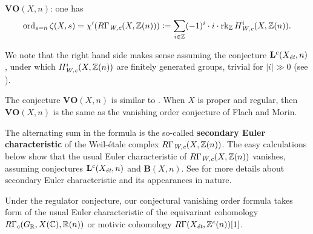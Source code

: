 \documentclass{article}
\numberwithin{equation}{section}
\begin{document}
\begin{conjecture}
  $\mathbf{VO} (X,n)$: one has
  \[ \ord_{s=n} \zeta (X,s) =
    \chi' (R\Gamma_\Wc (X, \ZZ (n))) \dfn
    \sum_{i \in \ZZ} (-1)^i \cdot i \cdot \rk_\ZZ H^i_\Wc (X, \ZZ (n)). \]
\end{conjecture}

We note that the right hand side makes sense assuming the conjecture
$\mathbf{L}^c (X_\et,n)$, under which $H^i_\Wc (X, \ZZ (n))$ are finitely
generated groups, trivial for $|i| \gg 0$
(see \cite[Proposition~7.12]{Beshenov-Weil-etale-1}).

\begin{remark}
  The conjecture $\mathbf{VO} (X,n)$ is similar to
  \cite[Conjecture~5.11]{Flach-Morin-2018}. When $X$ is proper and regular, then
  $\mathbf{VO} (X,n)$ is the same as the vanishing order conjecture of Flach and
  Morin.
\end{remark}

\begin{remark}
  The alternating sum in the formula is the so-called
  \textbf{secondary Euler characteristic} of the Weil-étale complex
  $R\Gamma_\Wc (X, \ZZ (n))$.  The easy calculations below show that the usual
  Euler characteristic of $R\Gamma_\Wc (X, \ZZ (n))$ vanishes, assuming
  conjectures $\mathbf{L}^c (X_\et,n)$ and $\mathbf{B} (X,n)$.
  See \cite{Ramachandran-2016} for more details about secondary Euler
  characteristic and its appearances in nature.
\end{remark}

Under the regulator conjecture, our conjectural vanishing order formula takes
form of the usual Euler characteristic of the equivariant cohomology
$R\Gamma_c (G_\RR, X(\CC), \RR (n))$ or motivic cohomology
$R\Gamma (X_\et, \ZZ^c (n)) [1]$.
\end{document}
